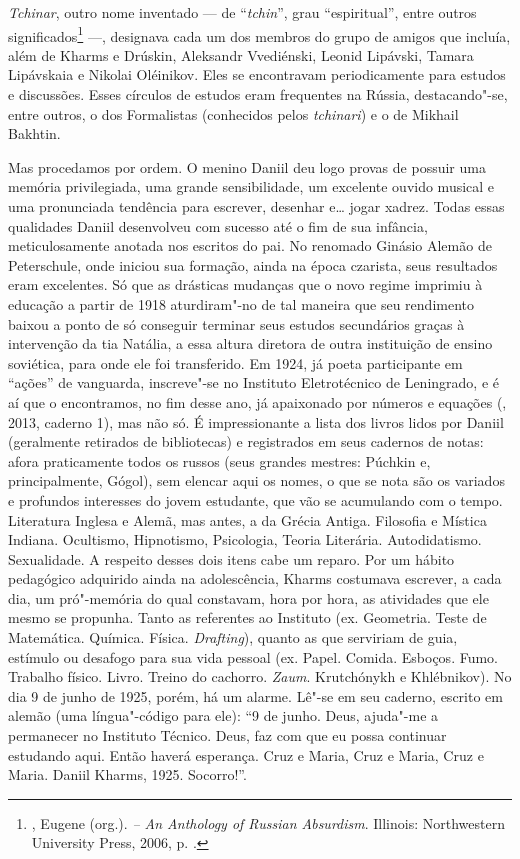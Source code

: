 \emph{Tchinar}, outro nome inventado --- de ``\emph{tchin}'', grau
``espiritual'', entre outros significados\footnote{,
Eugene (org.). \emph{ -- An Anthology of Russian
Absurdism}. Illinois: Northwestern University Press, 2006, p.
.} ---, designava cada um dos membros do grupo de
amigos que incluía, além de Kharms e Drúskin, Aleksandr Vvediénski,
Leonid Lipávski, Tamara Lipávskaia e Nikolai Oléinikov. Eles se
encontravam periodicamente para estudos e discussões. Esses círculos
de estudos eram frequentes na Rússia, destacando"-se, entre outros,
o dos Formalistas (conhecidos pelos \emph{tchinari}) e o de Mikhail
Bakhtin.

Mas procedamos por ordem. O menino Daniil deu logo provas de
possuir uma memória privilegiada, uma grande sensibilidade,
um excelente ouvido musical e uma pronunciada tendência para
escrever, desenhar e\ldots{} jogar xadrez. Todas essas qualidades
Daniil desenvolveu com sucesso até o fim de sua infância,
meticulosamente anotada nos escritos do pai. No renomado Ginásio
Alemão de Peterschule, onde iniciou sua formação, ainda na época
czarista, seus resultados eram excelentes. Só que as drásticas
mudanças que o novo regime imprimiu à educação a partir de 1918
aturdiram"-no de tal maneira que seu rendimento baixou a ponto de só
conseguir terminar seus estudos secundários graças à intervenção da
tia Natália, a essa altura diretora de outra instituição de ensino
soviética, para onde ele foi transferido. Em 1924, já poeta
participante em ``ações'' de vanguarda, inscreve"-se no Instituto
Eletrotécnico de Leningrado, e é aí que o encontramos, no fim
desse ano, já apaixonado por números e equações (, 2013, caderno 1), mas não só. É impressionante a lista dos livros lidos por Daniil (geralmente retirados de bibliotecas) e registrados
em seus cadernos de notas: afora praticamente todos os russos
(seus grandes mestres: Púchkin e, principalmente, Gógol), sem
elencar aqui os nomes, o que se nota são os variados e profundos
interesses do jovem estudante, que vão se acumulando com o tempo.
Literatura Inglesa e Alemã, mas antes, a da Grécia Antiga.
Filosofia e Mística Indiana. Ocultismo, Hipnotismo, Psicologia,
Teoria Literária. Autodidatismo. Sexualidade. A respeito desses
dois itens cabe um reparo. Por um hábito pedagógico adquirido
ainda na adolescência, Kharms costumava escrever, a cada dia, um
pró"-memória do qual constavam, hora por hora, as atividades que
ele mesmo se propunha. Tanto as referentes ao Instituto (ex.
Geometria. Teste de Matemática. Química. Física. \emph{Drafting}),
quanto as que serviriam de guia, estímulo ou desafogo para sua
vida pessoal (ex. Papel. Comida. Esboços. Fumo. Trabalho físico.
Livro. Treino do cachorro. \emph{Zaum}. Krutchónykh e Khlébnikov).
No dia 9 de junho de 1925, porém, há um alarme. Lê"-se em seu
caderno, escrito em alemão (uma língua"-código para ele): ``9 de
junho. Deus, ajuda"-me a permanecer no Instituto Técnico. Deus,
faz com que eu possa continuar estudando aqui. Então haverá
esperança. Cruz e Maria, Cruz e Maria, Cruz e Maria. Daniil
Kharms, 1925. Socorro!''.

